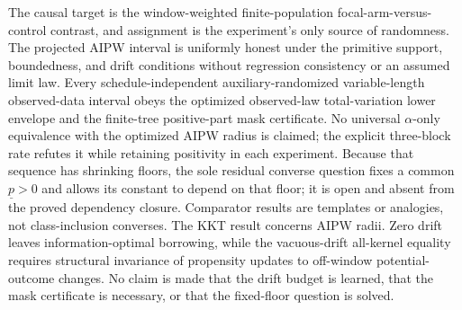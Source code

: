 \documentclass{article}
\begin{document}
The causal target is the window-weighted finite-population focal-arm-versus-control contrast, and assignment is the experiment's only source of randomness. The projected AIPW interval is uniformly honest under the primitive support, boundedness, and drift conditions without regression consistency or an assumed limit law. Every schedule-independent auxiliary-randomized variable-length observed-data interval obeys the optimized observed-law total-variation lower envelope and the finite-tree positive-part mask certificate. No universal \(\alpha\)-only equivalence with the optimized AIPW radius is claimed; the explicit three-block rate refutes it while retaining positivity in each experiment. Because that sequence has shrinking floors, the sole residual converse question fixes a common \(\underline p>0\) and allows its constant to depend on that floor; it is open and absent from the proved dependency closure. Comparator results are templates or analogies, not class-inclusion converses. The KKT result concerns AIPW radii. Zero drift leaves information-optimal borrowing, while the vacuous-drift all-kernel equality requires structural invariance of propensity updates to off-window potential-outcome changes. No claim is made that the drift budget is learned, that the mask certificate is necessary, or that the fixed-floor question is solved.
\end{document}

